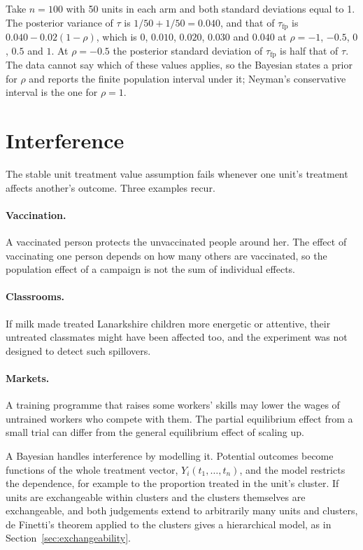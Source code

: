 Take $n = 100$ with 50 units in each arm and both standard deviations equal to 1. The posterior variance of $\tau$ is $1/50 + 1/50 = 0.040$, and that of $\tau_{\mathrm{fp}}$ is $0.040 - 0.02(1 - \rho)$, which is $0$, $0.010$, $0.020$, $0.030$ and $0.040$ at $\rho = -1$, $-0.5$, $0$, $0.5$ and $1$. At $\rho = -0.5$ the posterior standard deviation of $\tau_{\mathrm{fp}}$ is half that of $\tau$. The data cannot say which of these values applies, so the Bayesian states a prior for $\rho$ and reports the finite population interval under it; Neyman's conservative interval is the one for $\rho = 1$.

\section{Interference}\label{sec:interference}

The stable unit treatment value assumption fails whenever one unit's treatment affects another's outcome. Three examples recur.

\paragraph{Vaccination.} A vaccinated person protects the unvaccinated people around her. The effect of vaccinating one person depends on how many others are vaccinated, so the population effect of a campaign is not the sum of individual effects.

\paragraph{Classrooms.} If milk made treated Lanarkshire children more energetic or attentive, their untreated classmates might have been affected too, and the experiment was not designed to detect such spillovers.

\paragraph{Markets.} A training programme that raises some workers' skills may lower the wages of untrained workers who compete with them. The partial equilibrium effect from a small trial can differ from the general equilibrium effect of scaling up.

A Bayesian handles interference by modelling it. Potential outcomes become functions of the whole treatment vector, $Y_i(t_1, \ldots, t_n)$, and the model restricts the dependence, for example to the proportion treated in the unit's cluster. If units are exchangeable within clusters and the clusters themselves are exchangeable, and both judgements extend to arbitrarily many units and clusters, de Finetti's theorem applied to the clusters gives a hierarchical model, as in Section~\ref{sec:exchangeability}.

